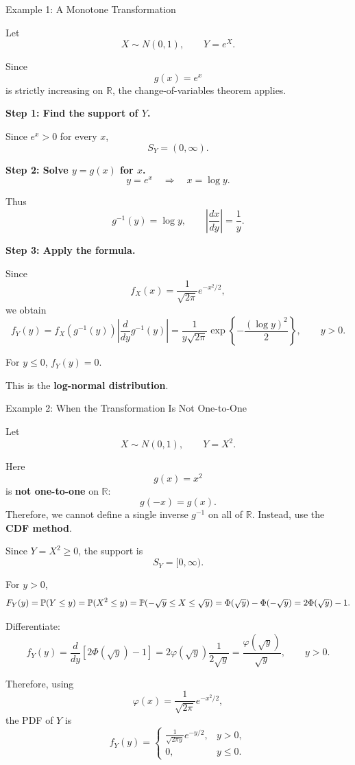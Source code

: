 \begin{frame}{Example 1: A Monotone Transformation}

\small

Let
\[
X\sim N(0,1),
\qquad
Y=e^X.
\]

Since
\[
g(x)=e^x
\]
is strictly increasing on $\mathbb R$, the change-of-variables theorem applies.

\textbf{Step 1: Find the support of $Y$.}

Since $e^x>0$ for every $x$,
\[
S_Y=(0,\infty).
\]

\textbf{Step 2: Solve $y=g(x)$ for $x$.}
\[
y=e^x
\quad\Longrightarrow\quad
x=\log y.
\]

Thus
\[
g^{-1}(y)=\log y,
\qquad
\left|\frac{dx}{dy}\right|=\frac{1}{y}.
\]

\textbf{Step 3: Apply the formula.}

Since
\[
f_X(x)=\frac{1}{\sqrt{2\pi}}e^{-x^2/2},
\]
we obtain
\[
{
f_Y(y)
=f_X\!\left(g^{-1}(y)\right)
\left|
\frac{d}{dy}g^{-1}(y)
\right|=
\frac{1}{y\sqrt{2\pi}}
\exp\left\{-\frac{(\log y)^2}{2}\right\},
\qquad y>0.
}
\]

For $y\le0$, $f_Y(y)=0$.

This is the \textbf{log-normal distribution}.

\end{frame}

\begin{frame}{Example 2: When the Transformation Is Not One-to-One}

\small

Let
\[
X\sim N(0,1),
\qquad
Y=X^2.
\]

Here
\[
g(x)=x^2
\]
is \textbf{not one-to-one} on $\mathbb R$:
\[
g(-x)=g(x).
\]
Therefore, we cannot define a single inverse $g^{-1}$ on all of $\mathbb R$.
Instead, use the \textbf{CDF method}.

Since $Y=X^2\ge0$, the support is
\[
S_Y=[0,\infty).
\]

For $y>0$,
\begin{equation}
F_Y(y)
=\mathbb{P}(Y\le y)
=\mathbb{P}(X^2\le y)
=\mathbb{P}(-\sqrt y\le X\le\sqrt y)
=\Phi(\sqrt y)-\Phi(-\sqrt y)
=2\Phi(\sqrt y)-1.
\end{equation}

Differentiate:
\begin{equation}
f_Y(y)
=\frac{d}{dy}\left[2\Phi(\sqrt y)-1\right]
=2\varphi(\sqrt y)\frac{1}{2\sqrt y}
=\frac{\varphi(\sqrt y)}{\sqrt y},
\qquad y>0.
\end{equation}

Therefore, using
\[
\varphi(x)=\frac{1}{\sqrt{2\pi}}e^{-x^2/2},
\]
the PDF of $Y$ is
\[
{
f_Y(y)
=
\begin{cases}
\displaystyle
\frac{1}{\sqrt{2\pi y}}e^{-y/2},
& y>0,\\[6pt]
0,
& y\le 0.
\end{cases}
}
\]

\end{frame}





